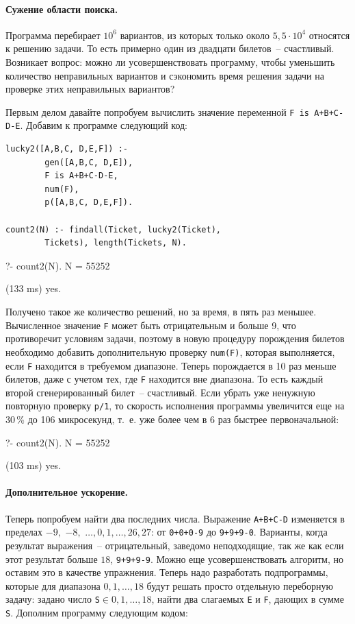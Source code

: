 \documentclass[a4paper,14pt, openany, twoside, final]{extbook} %
\begin{document}
\paragraph{Сужение области поиска.} Программа перебирает $10^6$ вариантов, из которых только около $5,5\cdot 10^4$ относятся к решению задачи. То есть примерно один из двадцати билетов~-- счастливый. Возникает вопрос: можно ли усовершенствовать программу, чтобы уменьшить количество неправильных вариантов и сэкономить время решения задачи на проверке этих неправильных вариантов?

Первым делом давайте попробуем вычислить значение переменной \texttt{F is A+B+C-D-E}. Добавим к программе следующий код:

\begin{verbatim}
lucky2([A,B,C, D,E,F]) :-
        gen([A,B,C, D,E]),
        F is A+B+C-D-E,
        num(F),
        p([A,B,C, D,E,F]).

count2(N) :- findall(Ticket, lucky2(Ticket),
        Tickets), length(Tickets, N).
\end{verbatim}

\begin{proexp}
?- count2(N).
N = 55252

(133 ms) yes.
\end{proexp}

Получено такое же количество решений, но за время, в пять раз меньшее. Вычисленное значение \texttt{F} может быть отрицательным и больше 9, что противоречит условиям задачи, поэтому в новую процедуру порождения билетов необходимо добавить дополнительную проверку \texttt{num(F)}, которая выполняется, если \texttt{F} находится в требуемом диапазоне. Теперь порождается в 10 раз меньше билетов, даже с учетом тех, где \texttt{F} находится вне диапазона. То есть каждый второй сгенерированный билет~-- счастливый.  Если убрать уже ненужную повторную проверку \texttt{p/1}, то скорость исполнения программы увеличится еще на 30\,{}\% до 106 микросекунд, т.~е. уже более чем в 6 раз быстрее первоначальной:

\begin{proexp}
?- count2(N).
N = 55252

(103 ms) yes.
\end{proexp}

\paragraph{Дополнительное ускорение.} Теперь попробуем найти два последних числа. Выражение \texttt{A+B+C-D} изменяется в пределах $-9,$ $-8,$ $\ldots,0,1,\ldots,26,27$: от \texttt{0+0+0-9} до \texttt{9+9+9-0}. Варианты, когда результат выражения~-- отрицательный, заведомо неподходящие, так же как если этот результат больше $18$, \texttt{9+9+9-9}. Можно еще усовершенствовать алгоритм, но оставим это в качестве упражнения. Теперь надо разработать подпрограммы, которые для диапазона $0,1,\ldots,18$ будут решать просто отдельную переборную задачу: задано число \texttt{S}$\in 0,1,\ldots,18$, найти два слагаемых \texttt{E} и \texttt{F}, дающих в сумме \texttt{S}. Дополним программу следующим кодом:
\end{document}
